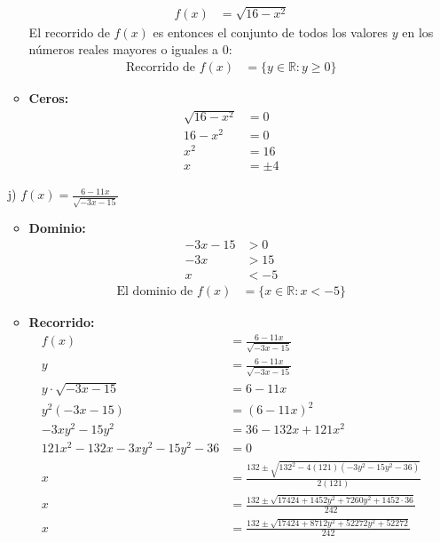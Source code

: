\documentclass{templateNote}
\begin{document}
\begin{itemize}
\begin{itemize}
\begin{align*}
            f(x) &= \sqrt{16 - x^2}
        \end{align*}
        El recorrido de \( f(x) \) es entonces el conjunto de todos los valores \( y \) en los números reales mayores o iguales a 0:
        \begin{align*}
            \text{Recorrido de } f(x) &= \{y \in \mathbb{R} : y \geq 0\}
        \end{align*}
        \item \textbf{Ceros:}
        \begin{align*}
            \sqrt{16 - x^2} &= 0 \\
            16 - x^2 &= 0 \\
            x^2 &= 16 \\
            x &= \pm 4
        \end{align*}
    \end{itemize}
    \item[j)] $f(x) = \frac{6 - 11x}{\sqrt{-3x - 15}}$
    \begin{itemize}
        \item \textbf{Dominio:}
        \begin{align*}
            -3x - 15 &> 0 \\
            -3x &> 15 \\
            x &< -5
        \end{align*}
        \begin{align*}
            \text{El dominio de } f(x) &= \{x \in \mathbb{R} : x < -5\}
        \end{align*}
        \item \textbf{Recorrido:}
        \begin{align*}
            f(x) &= \frac{6 - 11x}{\sqrt{-3x - 15}} \\
            y &= \frac{6 - 11x}{\sqrt{-3x - 15}} \\
            y \cdot \sqrt{-3x - 15} &= 6 - 11x \\
            y^2(-3x - 15) &= (6 - 11x)^2 \\
            -3xy^2 - 15y^2 &= 36 - 132x + 121x^2 \\
            121x^2 - 132x - 3xy^2 - 15y^2 - 36 &= 0 \\
            x &= \frac{132 \pm \sqrt{132^2 - 4(121)(-3y^2 - 15y^2 - 36)}}{2(121)} \\
            x &= \frac{132 \pm \sqrt{17424 + 1452y^2 + 7260y^2 + 1452 \cdot 36}}{242} \\
            x &= \frac{132 \pm \sqrt{17424 + 8712y^2 + 52272y^2 + 52272}}{242} \\

\end{align*}
\end{itemize}
\end{itemize}
\end{document}
